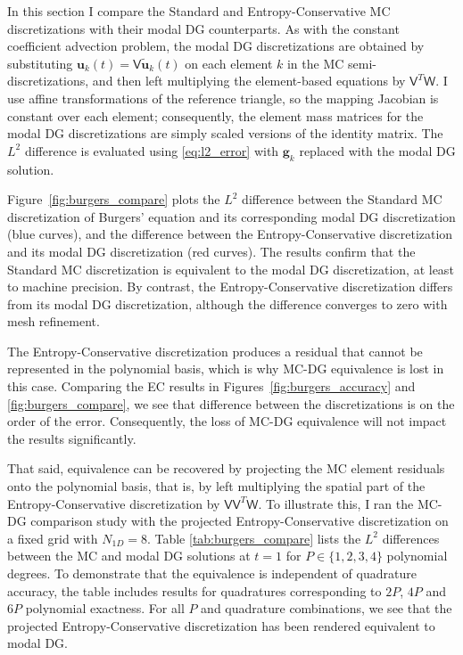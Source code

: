 \documentclass[pdflatex,sn-mathphys-num]{sn-jnl}%
\theoremstyle{thmstyleone}%
\theoremstyle{thmstyletwo}%
\theoremstyle{thmstylethree}%
\newcommand{\mat}[1]{\ensuremath{\mathsf{#1}}}
\begin{document}
In this section I compare the Standard and Entropy-Conservative MC discretizations with their modal DG counterparts.  As with the constant coefficient advection problem, the modal DG discretizations are obtained by substituting $\bm{u}_k(t) = \mat{V} \tilde{\bm{u}}_k(t)$ on each element $k$ in the MC semi-discretizations, and then left multiplying the element-based equations by $\mat{V}^T \mat{W}$.  I use affine transformations of the reference triangle, so the mapping Jacobian is constant over each element; consequently, the element mass matrices for the modal DG discretizations are simply scaled versions of the identity matrix.  The $L^2$ difference is evaluated using \eqref{eq:l2_error} with $\bm{g}_k$ replaced with the modal DG solution.

Figure~\ref{fig:burgers_compare} plots the $L^2$ difference between the Standard MC discretization of Burgers' equation and its corresponding modal DG discretization (blue curves), and the difference between the Entropy-Conservative discretization and its modal DG discretization (red curves). The results confirm that the Standard MC discretization is equivalent to the modal DG discretization, at least to machine precision.  By contrast, the Entropy-Conservative discretization differs from its modal DG discretization, although the difference converges to zero with mesh refinement.

The Entropy-Conservative discretization produces a residual that cannot be represented in the polynomial basis, which is why MC-DG equivalence is lost in this case.  Comparing the EC results in Figures~\ref{fig:burgers_accuracy} and \ref{fig:burgers_compare}, we see that difference between the discretizations is on the order of the error.  Consequently, the loss of MC-DG equivalence will not impact the results significantly.

That said, equivalence can be recovered by projecting the MC element residuals onto the polynomial basis, that is, by left multiplying the spatial part of the Entropy-Conservative discretization by $\mat{V} \mat{V}^T \mat{W}$.  To illustrate this, I ran the MC-DG comparison study with the projected Entropy-Conservative discretization on a fixed grid with $N_{1D} = 8$.  Table \ref{tab:burgers_compare} lists the $L^2$ differences between the MC and modal DG solutions at $t=1$ for $P \in \{1,2,3,4\}$ polynomial degrees.  To demonstrate that the equivalence is independent of quadrature accuracy, the table includes results for quadratures corresponding to $2P$, $4P$ and $6P$ polynomial exactness.  For all $P$ and quadrature combinations, we see that the projected Entropy-Conservative discretization has been rendered equivalent to modal DG.
\end{document}

